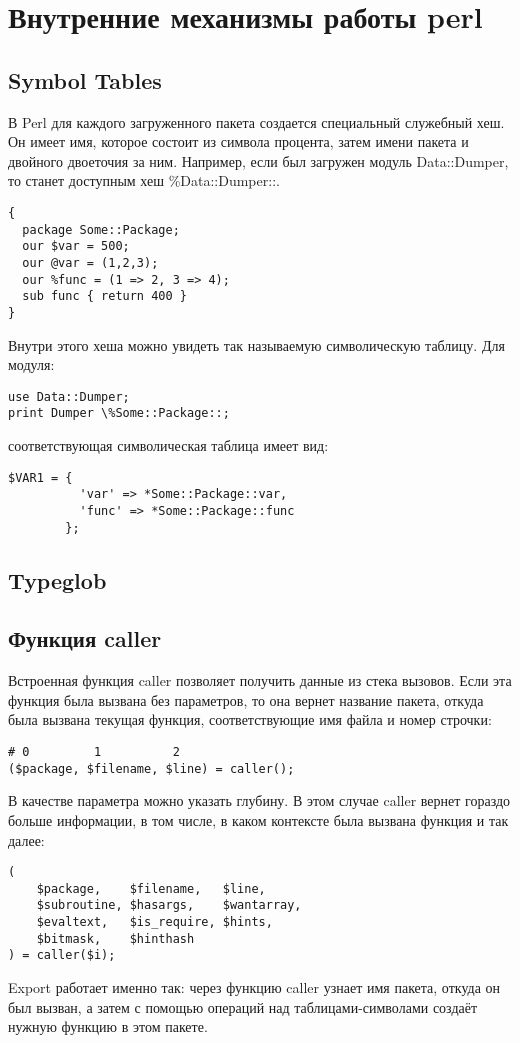 \section{Внутренние механизмы работы perl}
\subsection{Symbol Tables} %
В Perl для каждого загруженного пакета создается специальный служебный хеш. Он имеет имя, которое состоит из символа процента, затем имени пакета и двойного двоеточия за ним. Например, если был загружен модуль Data::Dumper, то станет доступным хеш \%Data::Dumper::.
\begin{verbatim}
{
  package Some::Package;
  our $var = 500;
  our @var = (1,2,3);
  our %func = (1 => 2, 3 => 4);
  sub func { return 400 }
}
\end{verbatim}
Внутри этого хеша можно увидеть так называемую символическую таблицу. Для модуля:
\begin{verbatim}
use Data::Dumper;
print Dumper \%Some::Package::;
\end{verbatim}
соответствующая символическая таблица имеет вид:
\begin{verbatim}
$VAR1 = {
          'var' => *Some::Package::var,
          'func' => *Some::Package::func
        };
\end{verbatim}


\subsection{Typeglob} %


\subsection{Функция caller} %
Встроенная функция caller позволяет получить данные из стека вызовов. Если эта функция была вызвана без параметров, то она вернет название пакета, откуда была вызвана текущая функция, соответствующие имя файла и номер строчки:
\begin{verbatim}
# 0         1          2
($package, $filename, $line) = caller();
\end{verbatim}
В качестве параметра можно указать глубину. В этом случае caller вернет гораздо больше информации, в том числе, в каком контексте была вызвана функция и так далее:
\begin{verbatim}
(
	$package,    $filename,   $line,
	$subroutine, $hasargs,    $wantarray,
	$evaltext,   $is_require, $hints,
	$bitmask,    $hinthash
) = caller($i);
\end{verbatim}
Export работает именно так: через функцию caller узнает имя пакета, откуда он был вызван, а затем с помощью операций над таблицами-символами создаёт нужную функцию в этом пакете.

